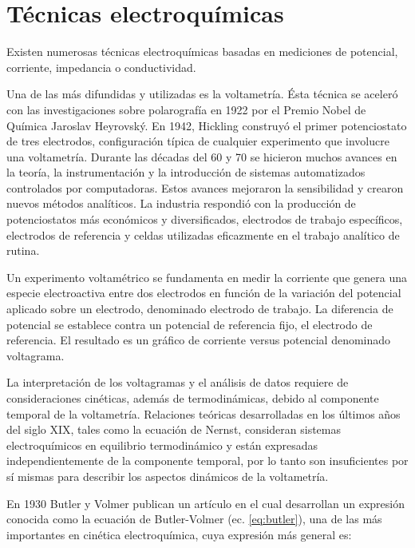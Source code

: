 \section{Técnicas electroquímicas}
					
		Existen numerosas técnicas electroquímicas basadas en mediciones de potencial, corriente, impedancia o conductividad.\cite{Wi2000,Bockris1974,koryta1993}

		Una de las más difundidas y utilizadas es la voltametría. Ésta técnica se aceleró con las investigaciones sobre polarografía en 1922 por el Premio Nobel de Química Jaroslav Heyrovský.\cite{Zuman1960} En 1942, Hickling construyó el primer potenciostato de tres electrodos, configuración típica de cualquier experimento que involucre una voltametría. \cite{hickling1942} Durante las décadas del 60 y 70 se hicieron muchos avances en la teoría, la instrumentación y la introducción de sistemas automatizados controlados por computadoras. Estos avances mejoraron la sensibilidad y crearon nuevos métodos analíticos. La industria respondió con la producción de potenciostatos más económicos y diversificados, electrodos de trabajo específicos, electrodos de referencia y celdas utilizadas eficazmente en el trabajo analítico de rutina.\cite{Wi2000}

		Un experimento voltamétrico se fundamenta en medir la corriente que genera una especie electroactiva entre dos electrodos en función de la variación del potencial aplicado sobre un electrodo, denominado electrodo de trabajo. La diferencia de potencial se establece contra un potencial de referencia fijo, el electrodo de referencia. El resultado es un gráfico de corriente versus potencial denominado voltagrama.

		La interpretación de los voltagramas y el análisis de datos requiere de consideraciones cinéticas, además de termodinámicas, debido al componente temporal de la voltametría. Relaciones teóricas desarrolladas en los últimos años del siglo XIX, tales como la ecuación de Nernst, consideran sistemas electroquímicos en equilibrio termodinámico y están expresadas independientemente de la componente temporal, por lo tanto son insuficientes por sí mismas para describir los aspectos dinámicos de la voltametría.\cite{nicholson1964}

		En 1930 Butler y Volmer publican un artículo en el cual desarrollan un expresión conocida como la ecuación de Butler-Volmer (ec. \ref{eq:butler}), una de las más importantes en cinética electroquímica, cuya expresión más general es\cite{Erdey-Gruz1930}: 

